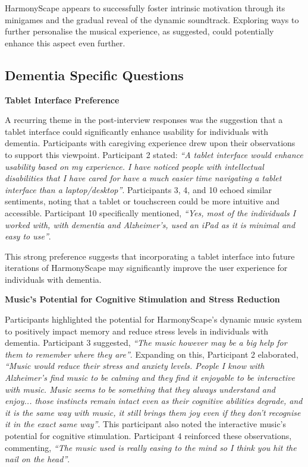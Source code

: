 \documentclass{l4proj}
\begin{document}
HarmonyScape appears to successfully foster intrinsic motivation through its minigames and the gradual reveal of the dynamic soundtrack. Exploring ways to further personalise the musical experience, as suggested, could potentially enhance this aspect even further.

\subsection{Dementia Specific Questions}

\textbf{Tablet Interface Preference}

A recurring theme in the post-interview responses was the suggestion that a tablet interface could significantly enhance usability for individuals with dementia. Participants with caregiving experience drew upon their observations to support this viewpoint. Participant 2 stated: \emph{“A tablet interface would enhance usability based on my experience. I have noticed people with intellectual disabilities that I have cared for have a much easier time navigating a tablet interface than a laptop/desktop”}. Participants 3, 4, and 10 echoed similar sentiments, noting that a tablet or touchscreen could be more intuitive and accessible. Participant 10 specifically mentioned, \emph{“Yes, most of the individuals I worked with, with dementia and Alzheimer's, used an iPad as it is minimal and easy to use”}. 

This strong preference suggests that incorporating a tablet interface into future iterations of HarmonyScape may significantly improve the user experience for individuals with dementia.
\newline

\textbf{Music's Potential for Cognitive Stimulation and Stress Reduction}

Participants highlighted the potential for HarmonyScape's dynamic music system to positively impact memory and reduce stress levels in individuals with dementia. Participant 3 suggested, \emph{“The music however may be a big help for them to remember where they are”}. Expanding on this, Participant 2 elaborated, \emph{“Music would reduce their stress and anxiety levels. People I know with Alzheimer's find music to be calming and they find it enjoyable to be interactive with music. Music seems to be something that they always understand and enjoy... those instincts remain intact even as their cognitive abilities degrade, and it is the same way with music, it still brings them joy even if they don't recognise it in the exact same way”}. This participant also noted the interactive music's potential for cognitive stimulation. Participant 4 reinforced these observations, commenting, \emph{“The music used is really easing to the mind so I think you hit the nail on the head”}. 
\end{document}
